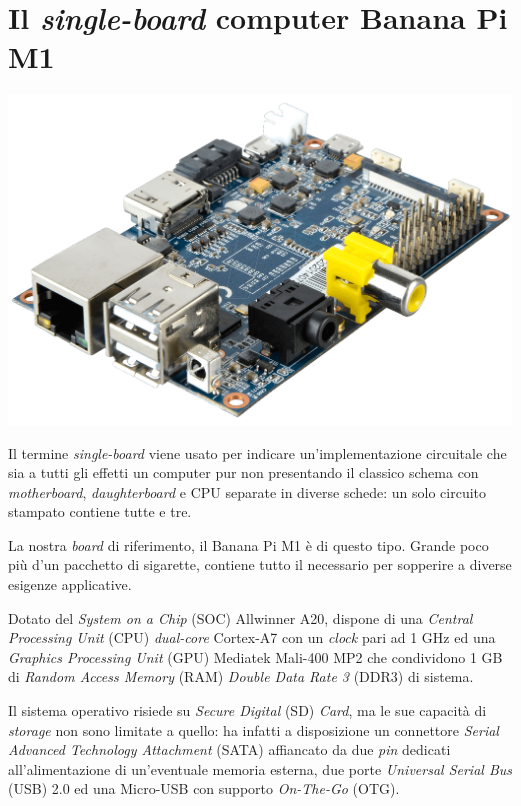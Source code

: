 \section{Il \emph{single-board} computer Banana Pi M1}
\begin{center}
\includegraphics[scale=0.175]{Figures/bananapi.png}\\
\end{center}
Il termine \emph{single-board} viene usato per indicare un'implementazione 
circuitale che sia a tutti gli effetti un computer pur non presentando il 
classico schema con \emph{motherboard}, \emph{daughterboard} e CPU separate in 
diverse schede: un solo circuito stampato contiene tutte e tre.

La nostra \emph{board} di riferimento, il Banana Pi M1 è di questo tipo. Grande 
poco più d'un pacchetto di sigarette, contiene tutto il necessario per 
sopperire a diverse esigenze applicative.

Dotato del \emph{System on a Chip} (SOC) Allwinner A20, dispone di una 
\textit{Central Processing Unit} (CPU) \emph{dual-core} Cortex-A7 con un 
\textit{clock} pari ad 1 GHz ed una \textit{Graphics Processing Unit} (GPU) 
Mediatek Mali-400 MP2 che condividono 1 GB di \textit{Random Access Memory} 
(RAM) \textit{Double Data Rate 3} (DDR3) di sistema.

Il sistema operativo risiede su \textit{Secure Digital} (SD) \textit{Card}, ma 
le sue capacità di \emph{storage} non sono limitate a quello: ha infatti a 
disposizione un connettore \textit{Serial Advanced Technology Attachment} 
(SATA) affiancato da due \emph{pin} dedicati all'alimentazione di un'eventuale 
memoria esterna, due porte \textit{Universal Serial Bus} (USB) 2.0 ed una 
Micro-USB con supporto \textit{On-The-Go} (OTG).

